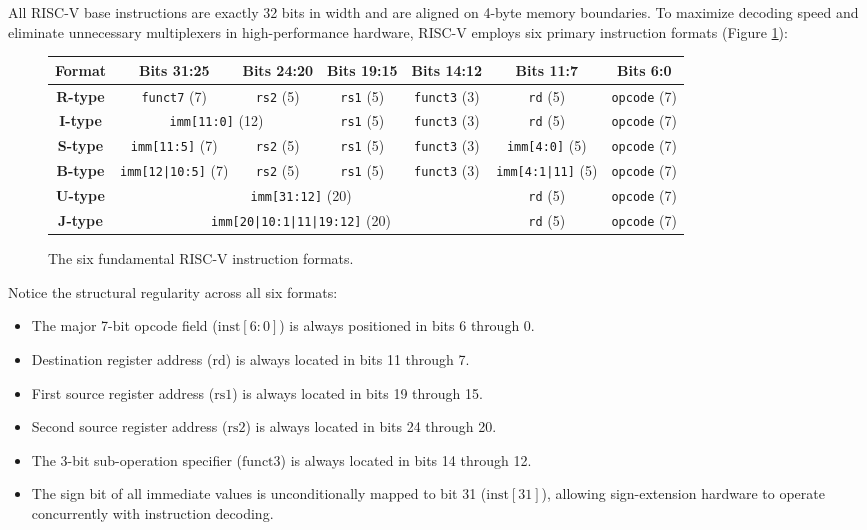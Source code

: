 All RISC-V base instructions are exactly 32 bits in width and are aligned on 4-byte memory boundaries. To maximize decoding speed and eliminate unnecessary multiplexers in high-performance hardware, RISC-V employs six primary instruction formats (Figure \ref{fig:riscv_formats}):

\begin{figure}[htbp]
\centering
\small
\begin{tabular}{|c|c|c|c|c|c|c|}
\hline
\textbf{Format} & \textbf{Bits 31:25} & \textbf{Bits 24:20} & \textbf{Bits 19:15} & \textbf{Bits 14:12} & \textbf{Bits 11:7} & \textbf{Bits 6:0} \\
\hline
\textbf{R-type} & \texttt{funct7} (7) & \texttt{rs2} (5) & \texttt{rs1} (5) & \texttt{funct3} (3) & \texttt{rd} (5) & \texttt{opcode} (7) \\
\textbf{I-type} & \multicolumn{2}{c|}{\texttt{imm[11:0]} (12)} & \texttt{rs1} (5) & \texttt{funct3} (3) & \texttt{rd} (5) & \texttt{opcode} (7) \\
\textbf{S-type} & \texttt{imm[11:5]} (7) & \texttt{rs2} (5) & \texttt{rs1} (5) & \texttt{funct3} (3) & \texttt{imm[4:0]} (5) & \texttt{opcode} (7) \\
\textbf{B-type} & \texttt{imm[12|10:5]} (7) & \texttt{rs2} (5) & \texttt{rs1} (5) & \texttt{funct3} (3) & \texttt{imm[4:1|11]} (5) & \texttt{opcode} (7) \\
\textbf{U-type} & \multicolumn{4}{c|}{\texttt{imm[31:12]} (20)} & \texttt{rd} (5) & \texttt{opcode} (7) \\
\textbf{J-type} & \multicolumn{4}{c|}{\texttt{imm[20|10:1|11|19:12]} (20)} & \texttt{rd} (5) & \texttt{opcode} (7) \\
\hline
\end{tabular}
\caption{The six fundamental RISC-V instruction formats.}\label{fig:riscv_formats}
\end{figure}

Notice the structural regularity across all six formats:
\begin{itemize}
    \item The major 7-bit opcode field ($\text{inst}[6:0]$) is always positioned in bits 6 through 0.
    \item Destination register address ($\text{rd}$) is always located in bits 11 through 7.
    \item First source register address ($\text{rs1}$) is always located in bits 19 through 15.
    \item Second source register address ($\text{rs2}$) is always located in bits 24 through 20.
    \item The 3-bit sub-operation specifier ($\text{funct3}$) is always located in bits 14 through 12.
    \item The sign bit of all immediate values is unconditionally mapped to bit 31 ($\text{inst}[31]$), allowing sign-extension hardware to operate concurrently with instruction decoding.
\end{itemize}

